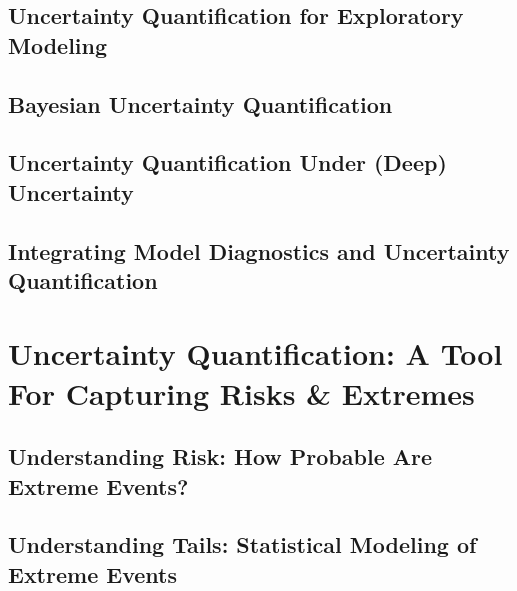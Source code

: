 \documentclass[letterpaper,10pt,english]{sphinxmanual}
\begin{document}
\section{Uncertainty Quantification for Exploratory Modeling}
\label{\detokenize{5_uncertainty_quantification_the_basics:uncertainty-quantification-for-exploratory-modeling}}

\section{Bayesian Uncertainty Quantification}
\label{\detokenize{5_uncertainty_quantification_the_basics:bayesian-uncertainty-quantification}}

\section{Uncertainty Quantification Under (Deep) Uncertainty}
\label{\detokenize{5_uncertainty_quantification_the_basics:uncertainty-quantification-under-deep-uncertainty}}

\section{Integrating Model Diagnostics and Uncertainty Quantification}
\label{\detokenize{5_uncertainty_quantification_the_basics:integrating-model-diagnostics-and-uncertainty-quantification}}

\chapter{Uncertainty Quantification: A Tool For Capturing Risks \& Extremes}
\label{\detokenize{6_uncertainty_quantification_a_tool_for_capturing_risks_and_extremes:uncertainty-quantification-a-tool-for-capturing-risks-extremes}}\label{\detokenize{6_uncertainty_quantification_a_tool_for_capturing_risks_and_extremes::doc}}

\section{Understanding Risk: How Probable Are Extreme Events?}
\label{\detokenize{6_uncertainty_quantification_a_tool_for_capturing_risks_and_extremes:understanding-risk-how-probable-are-extreme-events}}

\section{Understanding Tails: Statistical Modeling of Extreme Events}
\label{\detokenize{6_uncertainty_quantification_a_tool_for_capturing_risks_and_extremes:understanding-tails-statistical-modeling-of-extreme-events}}
\end{document}
